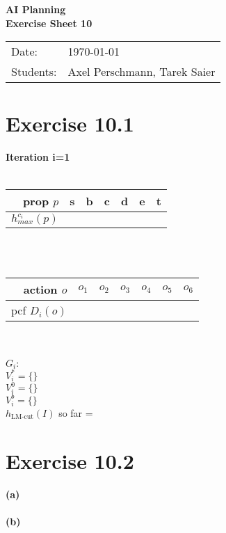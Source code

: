 \documentclass[11pt,a4paper]{article}
\newcommand{\sheetNr}{10}
\begin{document}
\begin{center}
\Huge{\textbf{AI Planning}}\\
\LARGE{\textbf{Exercise Sheet \sheetNr}}
\end{center}
\vspace{2cm}
\begin{tabular}{ll}
Date: & \today\\
Students: & Axel Perschmann, Tarek Saier
\end{tabular}

\section*{Exercise 10.1}
\textbf{Iteration i=1}\\
\\
\begin{tabular}{r|cccccc}
prop $p$ & s & b & c & d & e & t\\
\hline
$h^{c_i}_{max}(p)$ &   &   &   &   &   &  
\end{tabular}\\
\\
\begin{tabular}{r|cccccc}
action $o$ & $o_1$ & $o_2$ & $o_3$ & $o_4$ & $o_5$ & $o_6$\\
\hline
pcf $D_i(o)$ &   &   &   &   &   &  
\end{tabular}\\
\\
$G_i:$\\
$V^*_i=\{\}$\\
$V^0_i=\{\}$\\
$V^b_i=\{\}$\\
$h_{\text{LM-cut}}(I)$ so far = 

\section*{Exercise 10.2}
\textbf{(a)} \\
\\
\textbf{(b)} \\

\label{lastpage}
\end{document}
